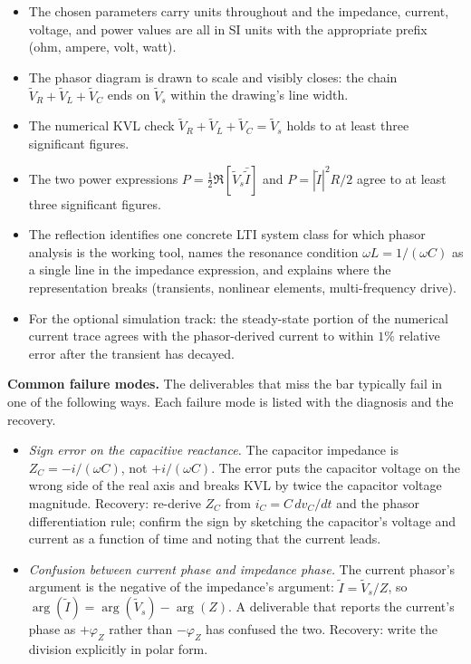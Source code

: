 \begin{project}
\begin{itemize}[leftmargin=*]
  \item The chosen parameters carry units throughout and the
    impedance, current, voltage, and power values are all in SI
    units with the appropriate prefix (ohm, ampere, volt, watt).
  \item The phasor diagram is drawn to scale and visibly closes:
    the chain $\tilde V_{R} + \tilde V_{L} + \tilde V_{C}$ ends on
    $\tilde V_{s}$ within the drawing's line width.
  \item The numerical KVL check $\tilde V_{R} + \tilde V_{L} +
    \tilde V_{C} = \tilde V_{s}$ holds to at least three significant
    figures.
  \item The two power expressions $P = \tfrac{1}{2}\Re[\tilde V_{s}
    \bar{\tilde I}]$ and $P = |\tilde I|^{2} R / 2$ agree to at
    least three significant figures.
  \item The reflection identifies one concrete LTI system class for
    which phasor analysis is the working tool, names the resonance
    condition $\omega L = 1/(\omega C)$ as a single line in the
    impedance expression, and explains where the representation
    breaks (transients, nonlinear elements, multi-frequency drive).
  \item For the optional simulation track: the steady-state portion
    of the numerical current trace agrees with the phasor-derived
    current to within $1\%$ relative error after the transient has
    decayed.
\end{itemize}

\textbf{Common failure modes.} The deliverables that miss the bar
typically fail in one of the following ways. Each failure mode is
listed with the diagnosis and the recovery.

\begin{itemize}[leftmargin=*]
  \item \emph{Sign error on the capacitive reactance.} The
    capacitor impedance is $Z_{C} = -i / (\omega C)$, not
    $+i / (\omega C)$. The error puts the capacitor voltage on the
    wrong side of the real axis and breaks KVL by twice the
    capacitor voltage magnitude. Recovery: re-derive $Z_{C}$ from
    $i_{C} = C\,d v_{C}/dt$ and the phasor differentiation rule;
    confirm the sign by sketching the capacitor's voltage and
    current as a function of time and noting that the current
    leads.

  \item \emph{Confusion between current phase and impedance phase.}
    The current phasor's argument is the negative of the
    impedance's argument: $\tilde I = \tilde V_{s}/Z$, so
    $\arg(\tilde I) = \arg(\tilde V_{s}) - \arg(Z)$. A deliverable
    that reports the current's phase as $+\varphi_{Z}$ rather than
    $-\varphi_{Z}$ has confused the two. Recovery: write the
    division explicitly in polar form.


\end{itemize}
\end{project}
